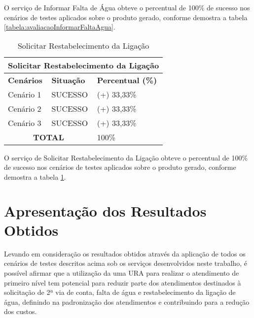 O serviço de Informar Falta de Água obteve o percentual de 100\% de sucesso nos cenários de testes aplicados sobre o produto gerado, conforme demostra a tabela \ref{tabela:avaliacaoInformarFaltaAgua}.


\begin{table}[H]
	\center
	\footnotesize
	\caption{Solicitar Restabelecimento da Ligação}
	\label{tabela:avaliacaoRestabelerLigacaoAgua}
	\begin{tabular}{|p{3cm}|p{3cm}|p{3cm}|}
		\hline
		\multicolumn{3}{|c|}{\textbf{Solicitar Restabelecimento da Ligação}} \\
		\hline
		\textbf{Cenários}  	& \textbf{Situação} & \textbf{Percentual (\%)}  \\
		\hline		
		Cenário 1			& SUCESSO 		& (+) 33,33\% 	\\
		\hline
		Cenário 2 			& SUCESSO		& (+) 33,33\% 	\\
		\hline
		Cenário 3 			& SUCESSO 		& (+) 33,33\%	\\
		\hline		
		\multicolumn{2}{|c|}{\textbf{TOTAL}}	& 100\% 	\\
		\hline				
	\end{tabular}
\end{table}

O serviço de Solicitar Restabelecimento da Ligação obteve o percentual de 100\% de sucesso nos cenários de testes aplicados sobre o produto gerado, conforme demostra a tabela \ref{tabela:avaliacaoRestabelerLigacaoAgua}.


\section{Apresentação dos Resultados Obtidos}

Levando em consideração os resultados obtidos através da aplicação de todos os cenários de testes descritos acima sob os serviços desenvolvidos neste trabalho, é possível afirmar que a utilização da uma URA para realizar o atendimento de primeiro nível tem potencial para reduzir parte dos atendimentos destinados à solicitação de 2ª via de conta, falta de água e restabelecimento da ligação de água, definindo na padronização dos atendimentos e contribuindo para a redução dos custos.
 


